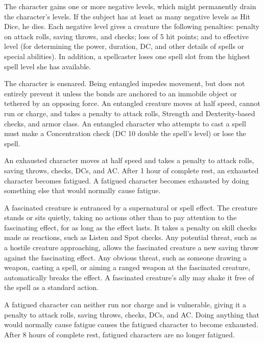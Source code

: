  The character gains one or more negative levels, which might permanently drain the character's levels. If the subject has at least as many negative levels as Hit Dice, he dies. Each negative level gives a creature the following penalties:  penalty on attack rolls, saving throws, and checks; loss of 5 hit points; and  to effective level (for determining the power, duration, DC, and other details of spells or special abilities). In addition, a spellcaster loses one spell slot from the highest spell level she has available.

 The character is ensnared. Being entangled impedes movement, but does not entirely prevent it unless the bonds are anchored to an immobile object or tethered by an opposing force. An entangled creature moves at half speed, cannot run or charge, and takes a  penalty to attack rolls, Strength and Dexterity-based checks, and armor class. An entangled character who attempts to cast a spell must make a Concentration check (DC 10 \add double the spell's level) or lose the spell.

 An exhausted character moves at half speed and takes a  penalty to attack rolls, saving throws, checks, DCs, and AC. After 1 hour of complete rest, an exhausted character becomes fatigued. A fatigued character becomes exhausted by doing something else that would normally cause fatigue.

 A fascinated creature is entranced by a supernatural or spell effect. The creature stands or sits quietly, taking no actions other than to pay attention to the fascinating effect, for as long as the effect lasts. It takes a  penalty on skill checks made as reactions, such as Listen and Spot checks. Any potential threat, such as a hostile creature approaching, allows the fascinated creature a new saving throw against the fascinating effect. Any obvious threat, such as someone drawing a weapon, casting a spell, or aiming a ranged weapon at the fascinated creature, automatically breaks the effect. A fascinated creature's ally may shake it free of the spell as a standard action.

 A fatigued character can neither run nor charge and is vulnerable, giving it a  penalty to attack rolls, saving throws, checks, DCs, and AC. Doing anything that would normally cause fatigue causes the fatigued character to become exhausted. After 8 hours of complete rest, fatigued characters are no longer fatigued.

